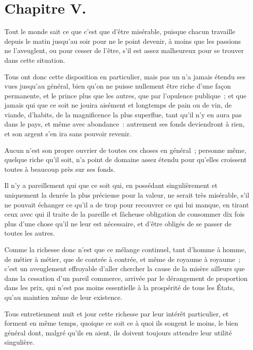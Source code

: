 \documentclass[french,twoside]{book} %
\begin{document}
\section[{Chapitre V.}]{Chapitre V.}
\noindent Tout le monde sait ce que c’est que d’être misérable, puisque chacun travaille depuis le matin jusqu’au soir pour ne le point devenir, à moins que les passions ne l’aveuglent, ou pour cesser de l’être, s’il est assez malheureux pour se trouver dans cette situation.\par
Tous ont donc cette disposition en particulier, mais pas un n’a jamais étendu ses vues jusqu’au général, bien qu’on ne puisse nullement être riche d’une façon permanente, et le prince plus que les autres, que par l’opulence publique ; et que jamais qui que ce soit ne jouira aisément et longtemps de pain ou de vin, de viande, d’habits, de la magnificence la plus superflue, tant qu’il n’y en aura pas dans le pays, et même avec abondance : autrement ses fonds deviendront à rien, et son argent s’en ira sans pouvoir revenir.\par
Aucun n’est son propre ouvrier de toutes ces choses en général ; personne même, quelque riche qu’il soit, n’a point de domaine assez étendu pour qu’elles croissent toutes à beaucoup près sur ses fonds.\par
Il n’y a pareillement qui que ce soit qui, en possédant singulièrement et uniquement la denrée la plus précieuse pour la valeur, ne serait très misérable, s’il ne pouvait échanger ce qu’il a de trop pour recouvrer ce qui lui manque, en tirant ceux avec qui il traite de la pareille et fâcheuse obligation de consommer dix fois plus d’une chose qu’il ne leur est nécessaire, et d’être obligés de se passer de toutes les autres.\par
Comme la richesse donc n’est que ce mélange continuel, tant d’homme à homme, de métier à métier, que de contrée à contrée, et même de royaume à royaume ; c’est un aveuglement effroyable d’aller chercher la cause de la misère ailleurs que dans la cessation d’un pareil commerce, arrivée par le dérangement de proportion dans les prix, qui n’est pas moins essentielle à la prospérité de tous les États, qu’au maintien même de leur existence.\par
Tous entretiennent nuit et jour cette richesse par leur intérêt particulier, et forment en même temps, quoique ce soit ce à quoi ils songent le moins, le bien général dont, malgré qu’ils en aient, ils doivent toujours attendre leur utilité singulière.\par
\end{document}
